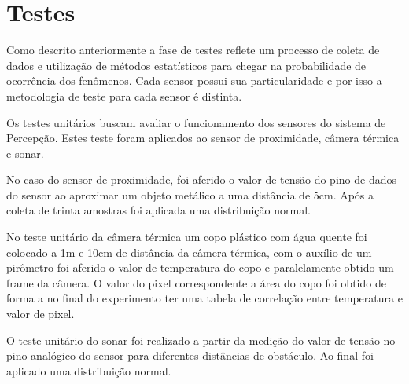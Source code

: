\section{Testes}
Como descrito anteriormente a fase de testes reflete um processo de coleta de dados e utilização de métodos estatísticos para chegar na probabilidade de ocorrência dos fenômenos. Cada sensor possui sua particularidade e por isso a metodologia de teste para cada sensor é distinta. 

Os testes unitários buscam avaliar o funcionamento dos sensores do sistema de Percepção. Estes teste foram aplicados ao sensor de proximidade, câmera térmica e sonar. 

No caso do sensor de proximidade, foi aferido o valor de tensão do pino de dados do sensor ao aproximar um objeto metálico a uma distância de 5cm. Após a coleta de trinta amostras foi aplicada uma distribuição normal.

No teste unitário da câmera térmica um copo plástico com água quente foi colocado a 1m e 10cm de distância da câmera térmica, com o auxílio de um pirômetro foi aferido o valor de temperatura do copo e paralelamente obtido um frame da câmera. O valor do pixel correspondente a área do copo foi obtido de forma a no final do experimento ter uma tabela de correlação entre temperatura e valor de pixel.

O teste unitário do sonar foi realizado a partir da medição do valor de tensão no pino analógico do sensor para diferentes distâncias de obstáculo. Ao final foi aplicado uma distribuição normal. 
